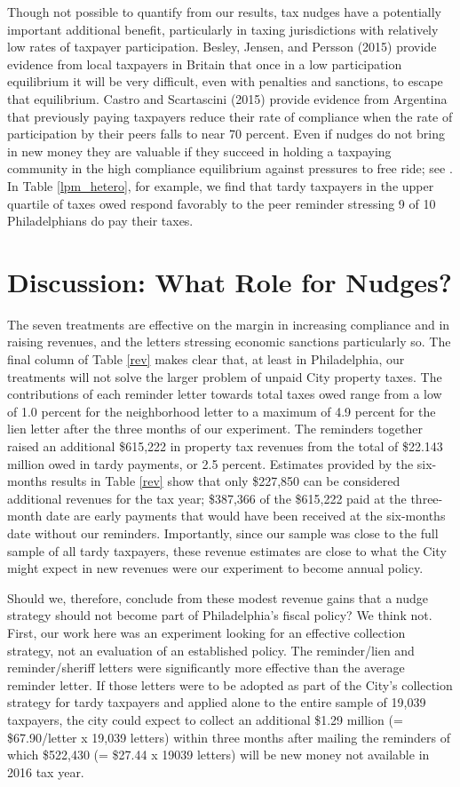 \documentclass[12pt]{article}
\begin{document}
Though not possible to quantify from our results, tax nudges have a
potentially important additional benefit, particularly in taxing
jurisdictions with relatively low rates of taxpayer
participation. Besley, Jensen, and Persson (2015) provide evidence
from local taxpayers in Britain that once in a low participation
equilibrium it will be very difficult, even with penalties and
sanctions, to escape that equilibrium.  Castro and Scartascini (2015)
provide evidence from Argentina that previously paying taxpayers
reduce their rate of compliance when the rate of participation by
their peers falls to near 70 percent.  Even if nudges do not bring in
new money they are valuable if they succeed in holding a taxpaying
community in the high compliance equilibrium against pressures to free
ride; see .  In Table \ref{lpm_hetero}, for example,
we find that tardy taxpayers in the upper quartile of taxes owed
respond favorably to the peer reminder stressing 9 of 10
Philadelphians do pay their taxes.


\section{Discussion: What Role for Nudges?}

The seven treatments are effective on the margin in increasing
compliance and in raising revenues, and the letters stressing economic
sanctions particularly so. The final column of Table \ref{rev} makes
clear that, at least in Philadelphia, our treatments will not solve the
larger problem of unpaid City property taxes.  The contributions of
each reminder letter towards total taxes owed range from a low of 1.0
percent for the neighborhood letter to a maximum of 4.9 percent for
the lien letter after the three months of our experiment.  The
reminders together raised an additional \$615,222 in property tax
revenues from the total of \$22.143 million owed in tardy payments, or
2.5 percent.  Estimates provided by the six-months results in Table
\ref{rev} show that only \$227,850 can be considered additional revenues for
the tax year; \$387,366 of the \$615,222 paid at the three-month date are
early payments that would have been received at the six-months date
without our reminders.  Importantly, since our sample was close
to the full sample of all tardy taxpayers, these revenue estimates are
close to what the City might expect in new revenues were our
experiment to become annual policy.

Should we, therefore, conclude from these modest revenue gains
that a nudge strategy should not become part of Philadelphia's fiscal
policy?  We think not.  First, our work here was an experiment looking
for an effective collection strategy, not an evaluation of an
established policy.  The reminder/lien and reminder/sheriff letters
were significantly more effective than the average reminder letter.
If those letters were to be adopted as part of the City's collection
strategy for tardy taxpayers and applied alone to the entire sample of
19,039 taxpayers, the city could expect to collect an additional
\$1.29 million (= \$67.90/letter x 19,039 letters) within three months
after mailing the reminders of which \$522,430 (= \$27.44 x 19039
letters) will be new money not available in 2016 tax year.
\end{document}
